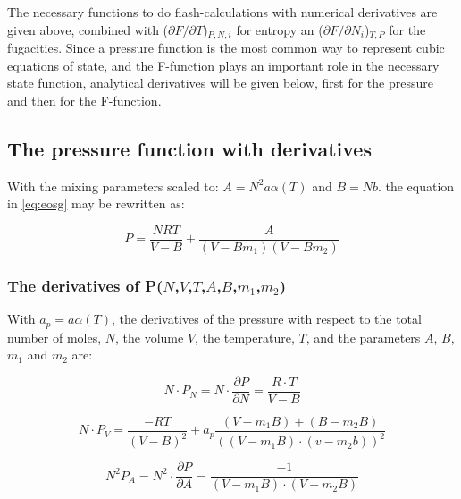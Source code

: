 \documentclass[a4paper, 12pt, english, sintefheadings, sintefcolour]{sintefmemo}
\begin{document}
The necessary functions to do flash-calculations with numerical derivatives
are given above, combined with ($\partial F/\partial T$)$_{P,N,i}$ for entropy
an ($\partial F/\partial N_i$)$_{T,P}$ for the fugacities.  Since a pressure
function is the most common way to represent cubic equations of state, and the
F-function plays an important role in the necessary state function, analytical
derivatives will be given below, first for the pressure and then for the
F-function.

\subsection{The pressure function with derivatives}
With the mixing parameters scaled to: $A=N^2a\alpha(T)$ and $B=Nb$. the equation in \ref{eq:eosg} may be rewritten as:

\begin{equation}
P=\frac{NRT}{V-B}+\frac{A}{\left(V-Bm_1\right)\left(V-Bm_2\right)}
\label{eq:eosg2}
\end{equation}

\subsubsection{The derivatives of P($N$,$V$,$T$,$A$,$B$,$m_1$,$m_2$)}

With $a_p=a\alpha(T)$, the derivatives of the pressure with respect to the
total number of moles, $N$, the volume $V$, the temperature, $T$, and the
parameters $A$, $B$, $m_1$ and $m_2$ are:

\noindent\hrulefill

\begin{equation}
N \cdot P_N=N\cdot\frac{\partial P}{\partial N}=\frac{R\cdot T}{V-B}
\end{equation}

\noindent\hrulefill

\begin{equation}
N\cdot P_V=\frac{-RT}{(V-B)^2}+a_p\frac{\left(V-m_1B\right)+\left(B-m_2B\right)}{\left((V-m_1B)\cdot (v-m_2b)\right)^2}
\end{equation}

\noindent\hrulefill

\begin{equation}
N^2P_A=N^2\cdot\frac{\partial P}{\partial A}=\frac{-1}{\left(V-m_1B\right)\cdot\left(V-m_2B\right)}
\end{equation}

\noindent\hrulefill
\end{document}
